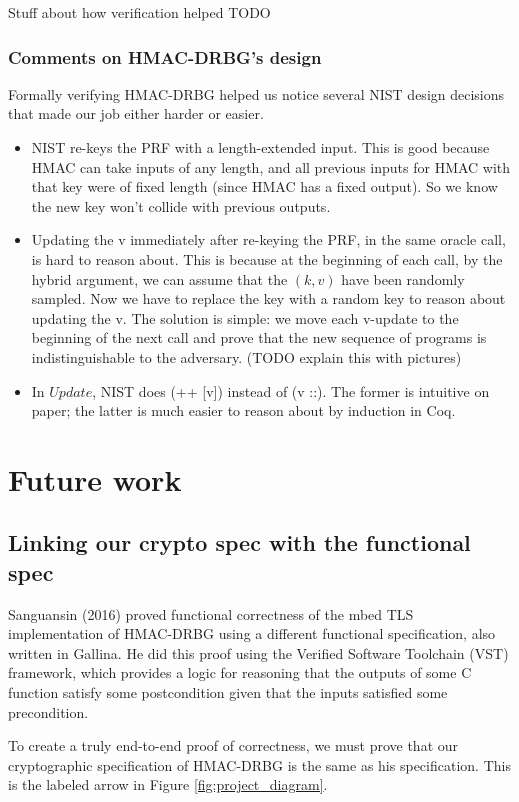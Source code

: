 \documentclass[12pt,lot, lof]{puthesis}
\newcommand{\kv} {$(k, v)$ }
\begin{document}
{Stuff about how verification helped TODO

\subsection{Comments on HMAC-DRBG's design}

Formally verifying HMAC-DRBG helped us notice several NIST design decisions that made our job either harder or easier.

\begin{itemize}
\item NIST re-keys the PRF with a length-extended input. This is good because HMAC can take inputs of any length, and all previous inputs for HMAC with that key were of fixed length (since HMAC has a fixed output). So we know the new key won't collide with previous outputs.
\item Updating the v immediately after re-keying the PRF, in the same oracle call, is hard to reason about. This is because at the beginning of each call, by the hybrid argument, we can assume that the \kv have been randomly sampled. Now we have to replace the key with a random key to reason about updating the v. The solution is simple: we move each v-update to the beginning of the next call and prove that the new sequence of programs is indistinguishable to the adversary. (TODO explain this with pictures)
\item In $Update$, NIST does (++ [v]) instead of (v ::). The former is intuitive on paper; the latter is much easier to reason about by induction in Coq.
\end{itemize}

\chapter{Future work}
\section{Linking our crypto spec with the functional spec}

Sanguansin (2016) proved functional correctness of the mbed TLS implementation of HMAC-DRBG using a different functional specification, also written in Gallina. He did this proof using the Verified Software Toolchain (VST) framework, which provides a logic for reasoning that the outputs of some C function satisfy some postcondition given that the inputs satisfied some precondition.

To create a truly end-to-end proof of correctness, we must prove that our cryptographic specification of HMAC-DRBG is the same as his specification. This is the labeled arrow in Figure \ref{fig:project_diagram}.

}
\end{document}
